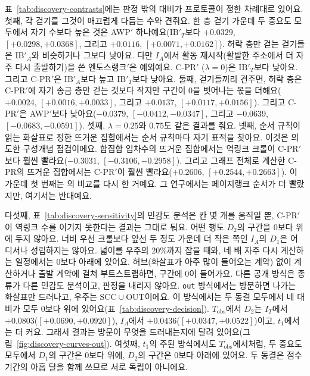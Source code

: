 표~\ref{tab:discovery-contrasts}에는 판정 밖의 대비가 프로토콜이 정한 차례대로 있어요. 첫째, 각 걷기를 그것이 매끄럽게 다듬는 수와 견줘요. 한 층 걷기 가운데 두 중요도 모두에서 자기 수보다 높은 것은 AWP$'$ 하나예요($\mathrm{IB}'_T$보다 $+0.0329$, $[+0.0298,+0.0368]$, 그리고 $+0.0116$, $[+0.0071,+0.0162]$). 허락 층만 걷는 걷기들은 $\mathrm{IB}'_A$와 비슷하거나 그보다 낮아요. 다만 $I_A$에서 활동 재시작(활발한 주소에서 더 자주 다시 출발하기)을 쓴 엔도스랭크$'$은 예외예요. \mbox{C-PR}$'$ ($\lambda=0$)은 $\mathrm{IB}'_T$보다 낮아요. 그리고 \mbox{C-PR}$'$은 $\mathrm{IB}'_A$보다 높고 $\mathrm{IB}'_T$보다 낮아요. 둘째, 걷기들끼리 견주면, 허락 층은 \mbox{C-PR}$'$에 자기 송금 층만 걷는 것보다 작지만 구간이 0을 벗어나는 몫을 더해요($+0.0024$, $[+0.0016,+0.0033]$, 그리고 $+0.0137$, $[+0.0117,+0.0156]$). 그리고 \mbox{C-PR}$'$은 AWP$'$보다 낮아요($-0.0379$, $[-0.0412,-0.0347]$, 그리고 $-0.0639$, $[-0.0683,-0.0591]$). 셋째, $\lambda=0.25$와 $0.75$도 같은 결과를 줘요. 넷째, 순서 규칙이 읽는 화살표로 정한 뜨거운 집합에서는 순서 규칙마다 자기 표적을 찾아요. 이것은 의도한 구성개념 점검이에요. 합집합 입차수의 뜨거운 집합에서는 역링크 크롤이 \mbox{C-PR}$'$보다 훨씬 빨라요($-0.3031$, $[-0.3106,-0.2958]$). 그리고 그래프 전체로 계산한 \mbox{C-PR}의 뜨거운 집합에서는 \mbox{C-PR}$'$이 훨씬 빨라요($+0.2606$, $[+0.2544,+0.2663]$). 이 가운데 첫 번째는 \textcite{cho1998crawling}의 비교를 다시 한 거예요. 그 연구에서는 페이지랭크 순서가 더 빨랐지만, 여기서는 반대예요.



다섯째, 표~\ref{tab:discovery-sensitivity}의 민감도 분석은 칸 몇 개를 움직일 뿐, \mbox{C-PR}$'$이 역링크 수를 이기지 못한다는 결과는 그대로 둬요. 어떤 행도 $D_2$의 구간을 0보다 위에 두지 않아요. 너비 우선 크롤보다 앞선 두 정도 가운데 더 작은 쪽인 $I_A$의 $D_1$은 어디서나 성립하지는 않아요. 넓이를 우주의 $20\%$까지 잡을 때와, 네 배 자주 다시 계산하는 일정에서는 0보다 아래에 있어요. 허브(화살표가 아주 많이 들어오는 계약) 없이 계산하거나 출발 계약에 걸쳐 부트스트랩하면, 구간에 0이 들어가요. 다른 공개 방식은 종류가 다른 민감도 분석이고, 판정을 내리지 않아요. \texttt{out} 방식에서는 방문하면 나가는 화살표만 드러나고, 우주는 $\mathrm{SCC}\cup\mathrm{OUT}$이에요. 이 방식에서는 두 동결 모두에서 네 대비가 모두 0보다 위에 있어요(표~\ref{tab:discovery-decision}). $T_{\mathrm{obs}}$에서 $D_2$는 $I_T$에서 $+0.0803$($[+0.0690,+0.0920]$), $I_A$에서 $+0.0436$($[+0.0347,+0.0522]$)이고, $t_1$에서는 더 커요. 그래서 결과는 방문이 무엇을 드러내는지에 달려 있어요(그림~\ref{fig:discovery-curves-out}). 여섯째, $t_1$의 주된 방식에서도 $T_{\mathrm{obs}}$에서처럼, 두 중요도 모두에서 $D_1$의 구간은 0보다 위에, $D_2$의 구간은 0보다 아래에 있어요. 두 동결은 점수 기간의 아홉 달을 함께 쓰므로 서로 독립이 아니에요.


